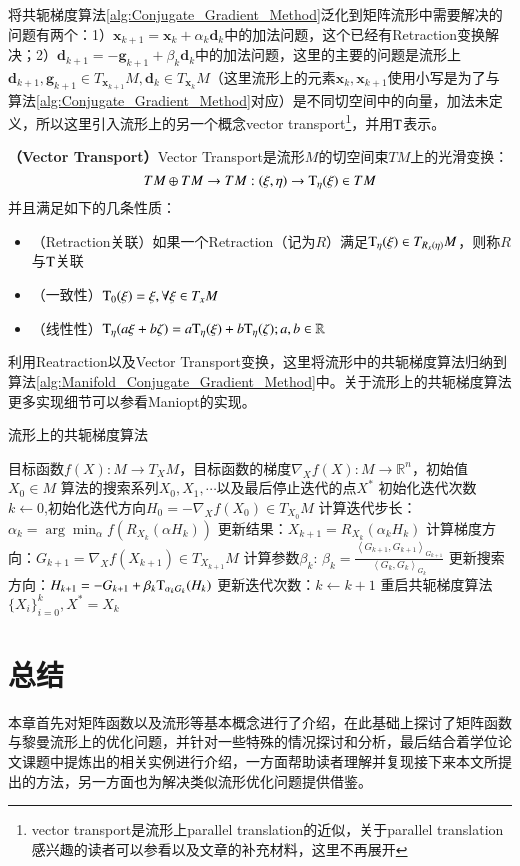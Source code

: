 将共轭梯度算法\ref{alg:Conjugate_Gradient_Method}泛化到矩阵流形中需要解决的问题有两个：1）$\bm{x}_{k+1}=\bm{x}_{k}+\alpha_{k}\bm{d}_k$中的加法问题，这个已经有Retraction变换解决；2）$\bm{d}_{k+1}=-\bm{g}_{k+1}+\beta_{k}\bm{d}_{k}$中的加法问题，这里的主要的问题是流形上$\bm{d}_{k+1},\bm{g}_{k+1} \in T_{\bm{x}_{k+1}}M,\bm{d}_{k} \in T_{\bm{x}_{k}}M$（这里流形上的元素$\bm{x}_{k},\bm{x}_{k+1}$使用小写是为了与算法\ref{alg:Conjugate_Gradient_Method}对应）是不同切空间中的向量，加法未定义，所以这里引入流形上的另一个概念vector transport\footnote{vector transport是流形上parallel translation的近似，关于parallel translation感兴趣的读者可以参看\cite{Maniopt_book,Maniopt_DiscreteCurveFitting}以及文章\cite{RCCA}的补充材料，这里不再展开}，并用${\rm T}$表示。
\begin{definition}
\label{Vector_Transport}
\textbf{（Vector Transport）}Vector Transport是流形$M$的切空间束$TM$上的光滑变换：
\begin{displaymath}
TM\oplus TM \rightarrow TM:(\xi,\eta)\rightarrow {\rm T}_{\eta}(\xi) \in TM
\end{displaymath}
并且满足如下的几条性质：
\begin{itemize}
\label{Vector_Transport_Properties}
\item （Retraction关联）如果一个Retraction（记为$R$）满足${\rm T}_{\eta}(\xi)\in T_{R_{x}(\eta)}M$，则称$R$与${\rm T}$关联
\item （一致性）${\rm T}_{0}(\xi)=\xi,\forall \xi \in T_{x}M$
\item （线性性）${\rm T}_{\eta}(a\xi+b\zeta)=a{\rm T}_{\eta}(\xi)+b{\rm T}_{\eta}(\zeta);a,b \in \mathbb{R}$
\end{itemize}
\end{definition}
利用Reatraction以及Vector Transport变换，这里将流形中的共轭梯度算法归纳到算法\ref{alg:Manifold_Conjugate_Gradient_Method}中。关于流形上的共轭梯度算法更多实现细节可以参看Maniopt\cite{Maniopt_tool}的实现。
\begin{algorithm}[t]
\caption{流形上的共轭梯度算法}
\label{alg:Manifold_Conjugate_Gradient_Method}
\begin{algorithmic}[1]
\REQUIRE 目标函数$f(X):M \rightarrow T_{X}M$，目标函数的梯度$\nabla_X f(X):M \rightarrow \mathbb{R}^{n}$，初始值$X_0 \in M$
\ENSURE 算法的搜索系列$X_0,X_1,\cdots$以及最后停止迭代的点$X^{*}$
\STATE 初始化迭代次数$k \leftarrow 0$,初始化迭代方向$H_{0}=-\nabla_X f(X_0)\in T_{X_0}M$
\STATE 计算迭代步长：$\alpha_{k}=\arg\min_{\alpha}f(R_{X_{k}}(\alpha H_{k}))$
\STATE 更新结果：$X_{k+1}=R_{X_{k}}(\alpha_{k}H_{k})$
\STATE 计算梯度方向：$G_{k+1}=\nabla_{X}f(X_{k+1}) \in T_{X_{k+1}}M$
\STATE 计算参数$\beta_{k}$: $\beta_{k}=\frac{\left<G_{k+1},G_{k+1}\right>_{G_{k+1}}}{\left<G_{k},G_{k}\right>_{G_{k}}}$
\STATE 更新搜索方向：$H_{k+1}=-G_{k+1}+\beta_{k}{\rm T}_{\alpha_{k}G_{k}}(H_{k})$
\STATE 更新迭代次数：$k\leftarrow k+1$
\STATE 重启共轭梯度算法
\ENDIF
\ENDWHILE
\RETURN $\{X_i\}_{i=0}^{k},X^{*}=X_{k}$
\end{algorithmic}
\end{algorithm}
\section{总结}
\label{opt_conclusion}
本章首先对矩阵函数以及流形等基本概念进行了介绍，在此基础上探讨了矩阵函数与黎曼流形上的优化问题，并针对一些特殊的情况探讨和分析，最后结合着学位论文课题中提炼出的相关实例进行介绍，一方面帮助读者理解并复现接下来本文所提出的方法，另一方面也为解决类似流形优化问题提供借鉴。